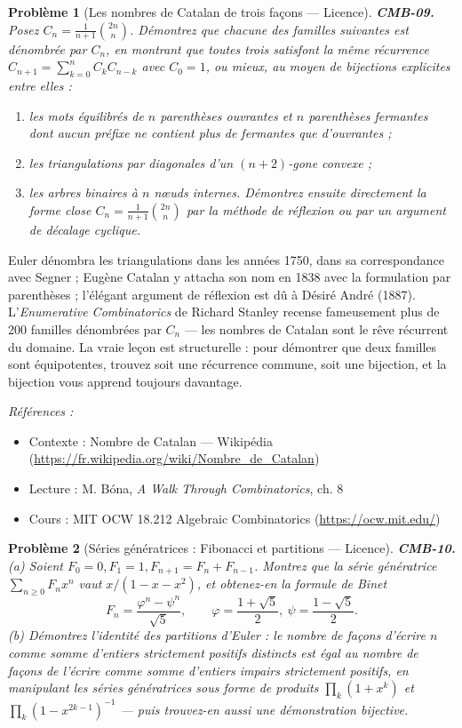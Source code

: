 \documentclass[11pt]{article}
\newtheorem{problem}{Problème}
\newenvironment{refs}{\par\small\noindent\emph{Références :}\begin{itemize}\setlength\itemsep{0pt}}{\end{itemize}\normalsize}
\begin{document}
\begin{problem}[{Les nombres de Catalan de trois façons --- Licence}]
\textbf{CMB-09.} Posez $ C_n = \frac{1}{n+1}\binom{2n}{n} $. Démontrez que chacune des
familles suivantes est dénombrée par $ C_n $, en montrant que toutes trois satisfont la même
récurrence $ C_{n+1} = \sum_{k=0}^{n} C_k C_{n-k} $ avec $ C_0 = 1 $, ou mieux, au moyen de
bijections explicites entre elles :
\begin{enumerate}
\item[(a)] les mots équilibrés de $ n $ parenthèses ouvrantes et $ n $ parenthèses fermantes dont
aucun préfixe ne contient plus de fermantes que d'ouvrantes ;
\item[(b)] les triangulations par diagonales d'un $ (n+2) $-gone convexe ;
\item[(c)] les arbres binaires à $ n $ n\oe{}uds internes. Démontrez ensuite directement la forme close
$ C_n = \frac{1}{n+1}\binom{2n}{n} $ par la méthode de réflexion ou par un argument de décalage
cyclique.
\end{enumerate}

\end{problem}

\noindent Euler dénombra les triangulations dans les années 1750, dans sa correspondance
avec Segner ; Eugène Catalan y attacha son nom en 1838 avec la formulation par parenthèses ;
l'élégant argument de réflexion est dû à Désiré André (1887). L'\textit{Enumerative Combinatorics} de
Richard Stanley recense fameusement plus de 200 familles dénombrées par $ C_n $ --- les nombres de
Catalan sont le rêve récurrent du domaine. La vraie leçon est structurelle : pour démontrer que
deux familles sont équipotentes, trouvez soit une récurrence commune, soit une bijection, et la
bijection vous apprend toujours davantage.

\begin{refs}
\item Contexte : Nombre de Catalan --- Wikipédia (\url{https://fr.wikipedia.org/wiki/Nombre_de_Catalan})
\item Lecture : M. Bóna, \textit{A Walk Through Combinatorics}, ch. 8
\item Cours : MIT OCW 18.212 Algebraic Combinatorics (\url{https://ocw.mit.edu/})
\end{refs}

\bigskip

\begin{problem}[{Séries génératrices : Fibonacci et partitions --- Licence}]
\textbf{CMB-10.} (a) Soient $ F_0 = 0, F_1 = 1, F_{n+1} = F_n + F_{n-1} $.
Montrez que la série génératrice $ \sum_{n\ge 0} F_n x^n $ vaut $ x/(1 - x - x^2) $, et
obtenez-en la formule de Binet
\[ F_n = \frac{\varphi^n - \psi^n}{\sqrt{5}}, \qquad \varphi = \frac{1+\sqrt{5}}{2},
\ \psi = \frac{1-\sqrt{5}}{2}. \]
(b) Démontrez l'identité des partitions d'Euler : le nombre de façons d'écrire $ n $ comme somme
d'entiers strictement positifs distincts est égal au nombre de façons de l'écrire comme somme
d'entiers impairs strictement positifs, en manipulant les séries génératrices sous forme de
produits $ \prod_k (1+x^k) $ et $ \prod_k (1-x^{2k-1})^{-1} $ --- puis trouvez-en aussi une
démonstration bijective.
\end{problem}
\end{document}
